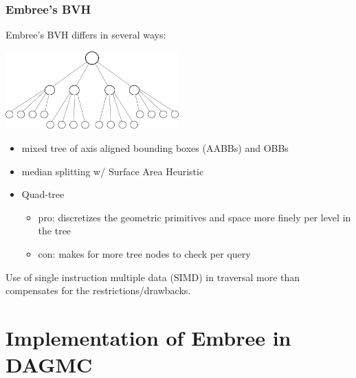 \documentclass[12pt]{beamer}
\begin{document}
\begin{frame}

\frametitle{Embree's BVH}

Embree's BVH differs in several ways:

\begin{center}
\includegraphics[width=0.5\textwidth]{quad_tree.png}
\end{center}

\begin{itemize}
\item mixed tree of axis aligned bounding boxes (AABBs) and OBBs
\item median splitting w/ Surface Area Heuristic {\scriptsize \cite{sah}}  
\item Quad-tree
  \begin{itemize}
  \item pro: discretizes the geometric primitives and space more finely per level in the tree
  \item con: makes for more tree nodes to check per query
  \end{itemize}
\end{itemize}
Use of single instruction multiple data (SIMD) in traversal  more than compensates for the restrictions/drawbacks.
\end{frame}


\section{Implementation of Embree in DAGMC} %
\end{document}
